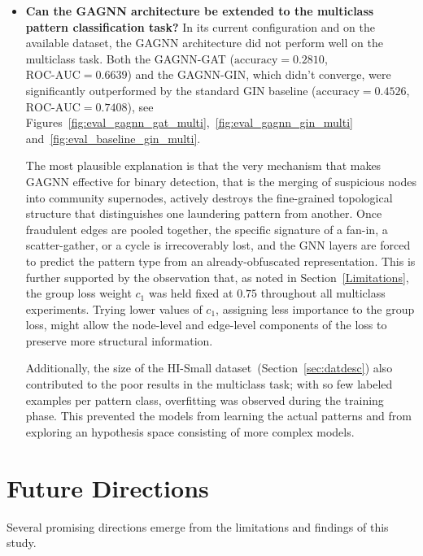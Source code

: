 \begin{itemize}
    \item \textbf{Can the GAGNN architecture be extended to the multiclass pattern classification task?}
    In its current configuration and on the available dataset, the GAGNN architecture did not perform well on the multiclass task. Both the GAGNN-GAT (\(\text{accuracy} = 0.2810\), \(\text{ROC-AUC} = 0.6639\)) and the GAGNN-GIN, which didn't converge, were significantly outperformed by the standard GIN baseline (\(\text{accuracy} = 0.4526\), \(\text{ROC-AUC} = 0.7408\)), see Figures~\ref{fig:eval_gagnn_gat_multi},~\ref{fig:eval_gagnn_gin_multi} and~\ref{fig:eval_baseline_gin_multi}. 
    
    The most plausible explanation is that the very mechanism that makes GAGNN effective for binary detection, that is the merging of suspicious nodes into community supernodes, actively destroys the fine-grained topological structure that distinguishes one laundering pattern from another. Once fraudulent edges are pooled together, the specific signature of a fan-in, a scatter-gather, or a cycle is irrecoverably lost, and the GNN layers are forced to predict the pattern type from an already-obfuscated representation. This is further supported by the observation that, as noted in Section~\ref{Limitations}, the group loss weight \(c_1\) was held fixed at \(0.75\) throughout all multiclass experiments. Trying lower values of \(c_1\), assigning less importance to the group loss, might allow the node-level and edge-level components of the loss to preserve more structural information.
    
    Additionally, the size of the HI-Small dataset~(Section~\ref{sec:datdesc}) also contributed to the poor results in the multiclass task; with so few labeled examples per pattern class, overfitting was observed during the training phase. This prevented the models from learning the actual patterns and from exploring an hypothesis space consisting of more complex models.
\end{itemize}

\section{Future Directions}
\label{futureDirections}

Several promising directions emerge from the limitations and findings of this study.

